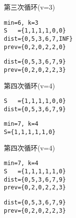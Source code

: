 \begin{frame}[fragile]\ft{\subsubsecname}

\tf 第三次循环(v=3)
\begin{lstlisting}
min=6, k=3
S   ={1,1,1,1,0,0}
dist={0,5,3,6,7,INF}
prev={0,2,0,2,2,0}
\end{lstlisting}
 


\begin{lstlisting}
dist={0,5,3,6,7,9}
prev={0,2,0,2,2,3}
\end{lstlisting}

\end{frame}


\begin{frame}[fragile]\ft{\subsubsecname}

\tf 第四次循环(v=4) 
\begin{lstlisting}
S   ={1,1,1,1,0,0}
dist={0,5,3,6,7,9}
\end{lstlisting}



\begin{lstlisting}
min=7, k=4
S={1,1,1,1,1,0}
\end{lstlisting}

\end{frame}


\begin{frame}[fragile]\ft{\subsubsecname}

\tf 第四次循环(v=4) 
\begin{lstlisting}
min=7, k=4
S   ={1,1,1,1,1,0}
dist={0,5,3,6,7,9}
prev={0,2,0,2,2,3}
\end{lstlisting}
 


\begin{lstlisting}
dist={0,5,3,6,7,9}
prev={0,2,0,2,2,3}
\end{lstlisting}

\end{frame}


